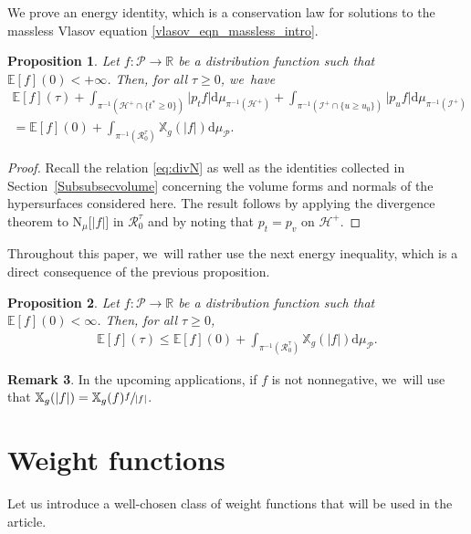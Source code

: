 \documentclass[JEP,XML,SOM,Unicode,published]{cedram}
\theoremstyle{plain}
\newtheorem{proposition}{Proposition}[section]
\theoremstyle{definition}
\newtheorem{remark}[proposition]{Remark}
\newcommand\R{{\mathbb{R}}}
\newcommand\T{{\mathbb{X}}}
\newcommand\dr{{\mathrm{d}}}
\begin{document}
We prove an energy identity, which is a conservation law for solutions to the massless Vlasov equation \eqref{vlasov_eqn_massless_intro}.

\begin{proposition}\label{Proenergy0}
Let $f \colon \mathcal{P} \to \R$ be a distribution function such that $\mathbb{E}[f](0)<+\infty$. Then, for all $ \tau \geq 0$, we~have
\begin{multline*}
\mathbb{E}[f](\tau)+ \int_{\pi^{-1 } (\mathcal{H}^+ \cap \{t^* \geq 0 \})} \big| p_t f \big| \dr \mu_{ \pi^{-1 } (\mathcal{H}^+)}+ \int_{\pi^{-1 } (\mathcal{I}^+ \cap \{u \geq u_0 \})} \big| p_u f \big| \dr \mu_{ \pi^{-1 } (\mathcal{I}^+)}\\
= \mathbb{E}[f](0)+ \int_{\pi^{-1} (\mathcal{R}_0^\tau) } \T_g (|f|) \dr \mu_{\mathcal{P}}.
\end{multline*}
\end{proposition}
\begin{proof}
Recall the relation \eqref{eq:divN} as well as the identities collected in Section~\ref{Subsubsecvolume} concerning the volume forms and normals of the hypersurfaces considered here. The result follows by applying the divergence theorem to $\mathrm{N}_{\mu}\bigl[|f| \bigr]$ in $ \mathcal{R}_0^\tau $ and by noting that $p_t=p_v$ on $\mathcal{H}^+$.
\end{proof}

Throughout this paper, we~will rather use the next energy inequality, which is a direct consequence of the previous proposition.
\begin{proposition}\label{Proenergy}
Let $f \colon \mathcal{P} \to \R$ be a distribution function such that $\mathbb{E}[f](0)<\infty$. Then, for all $ \tau \geq 0$,
\begin{align*}
\mathbb{E}[f](\tau) \leq \mathbb{E}[f](0)+\int_{\pi^{-1} (\mathcal{R}_0^\tau) } \T_g (|f|) \dr \mu_{\mathcal{P}}.
\end{align*}
\end{proposition}
\begin{remark}
In the upcoming applications, if $f$ is not nonnegative, we~will use that $\T_g(|f|)=\T_g(f)\sfrac{f}{|f|}$.
\end{remark}

\section{Weight functions}\label{Sec3}

Let us introduce a well-chosen class of weight functions that will be used in the article.
\end{document}
